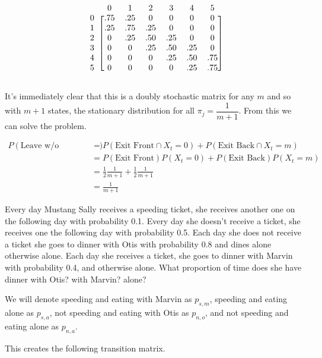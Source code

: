\documentclass[10pt,a4paper]{exam}
\begin{document}
\begin{questions}
\begin{solution}
$$\begin{blockarray}{ccccccc}
& 0 & 1 & 2 & 3 & 4 & 5\\
\begin{block}{c[cccccc]}
0 & .75 & .25 & 0 & 0 & 0 & 0\\
1 & .25 & .75 & .25 & 0 & 0 & 0\\
2 & 0 & .25 & .50 & .25 & 0 & 0\\
3 & 0 & 0 & .25 & .50 & .25 & 0\\
4 & 0 & 0 & 0  & .25 & .50 & .75\\
5 & 0 & 0 & 0 & 0 & .25 & .75\\
\end{block}
\end{blockarray}$$

It's immediately clear that this is a doubly stochastic matrix for any $m$ and so with $m+1$ states, the stationary distribution for all $\pi_j = \dfrac{1}{m+1}$. From this we can solve the problem.

\begin{align*}
P(\text{Leave w/o Sunglasses}) &= P(\text{Exit Front}\cap X_t = 0) + P(\text{Exit Back}\cap X_t = m)\\
												&= P(\text{Exit Front})P(X_t = 0) + P(\text{Exit Back})P(X_t = m)\\
												&= \frac{1}{2}\frac{1}{m+1} + \frac{1}{2}\frac{1}{m+1}\\
												&= \frac{1}{m+1}
\end{align*}
\end{solution}
\pagebreak
\question Every day Mustang Sally receives a speeding ticket, she receives another one on the following day with probability 0.1. Every day she doesn't receive a ticket, she receives one the following day with probability 0.5. Each day she does not receive a ticket she goes to dinner with Otis with probability 0.8 and dines alone otherwise alone. Each day she receives a ticket, she goes to dinner with Marvin with probability 0.4, and otherwise alone. What proportion of time does she have dinner with Otis? with Marvin? alone?

\begin{solution}
We will denote speeding and eating with Marvin as $p_{s,m}$, speeding and eating alone as $p_{s,a}$, not speeding and eating with Otis as $p_{n,o}$, and not speeding and eating alone as $p_{n,a}$. 

This creates the following transition matrix.


\end{solution}
\end{questions}
\end{document}
